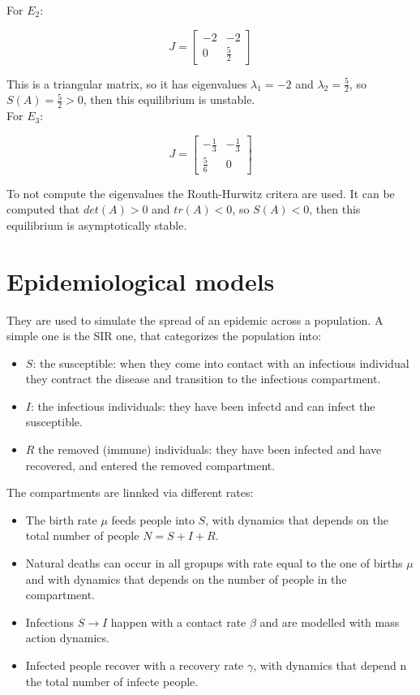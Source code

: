   For $E_2$:

  $$J = \begin{bmatrix} -2 & -2\\ 0 & \frac{5}{2}\end{bmatrix}$$

  This is a triangular matrix, so it has eigenvalues $\lambda_1 = -2$ and $\lambda_2 = \frac{5}{2}$, so $S(A) = \frac{5}{2} > 0$, then this equilibrium is unstable.\\

  For $E_3$:

  $$J=\begin{bmatrix} -\frac{1}{3} & -\frac{1}{3}\\ \frac{5}{6} & 0\end{bmatrix}$$

  To not compute the eigenvalues the Routh-Hurwitz critera are used.
  It can be computed that $det(A) > 0$ and $tr(A) < 0$, so $S(A) < 0$, then this equilibrium is asymptotically stable.

\section{Epidemiological models}
They are used to simulate the spread of an epidemic across a population.
A simple one is the SIR one, that categorizes the population into:

\begin{multicols}{2}
  \begin{itemize}
    \item $S$: the susceptible: when they come into contact with an infectious individual they contract the disease and transition to the infectious compartment.
    \item $I$: the infectious individuals: they have been infectd and can infect the susceptible.
    \item $R$ the removed (immune) individuals: they have been infected and have recovered, and entered the removed compartment.
  \end{itemize}
\end{multicols}

The compartments are linnked via different rates:

\begin{multicols}{2}
  \begin{itemize}
    \item The birth rate $\mu$ feeds people into $S$, with dynamics that depends on the total number of people $N = S+I+R$.
    \item Natural deaths can occur in all gropups with rate equal to the one of births $\mu$ and with dynamics that depends on the number of people in the compartment.
    \item Infections $S\to I$ happen with a contact rate $\beta$ and are modelled with mass action dynamics.
    \item Infected people recover with a recovery rate $\gamma$, with dynamics that depend n the total number of infecte people.
  \end{itemize}
\end{multicols}

